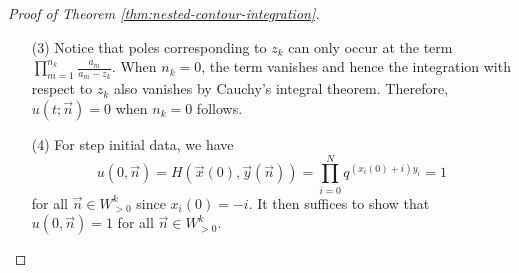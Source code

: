 \begin{proof}[Proof of Theorem \ref{thm:nested-contour-integration}]
\begin{enumerate}
From Equation (\ref{proof-nested-contour}), we have that $\nabla_i u(t;\vec{n}) = - \frac{z_i}{a_{n_i}} u(t;\vec{n})$ and hence 
\begin{align*}
& \quad (\nabla_1 - q \nabla_2) u(t;\vec{n}) \\
&= - \frac{z_1 - qz_2}{a_{n_1}} u(t;\vec{n}) \\
&= \frac{(-1)^k q^{k(k-1)/2}}{(2 \pi i)^k} \times \int \dots \int \left( - \frac{z_1 - qz_2}{a_{n_1}} \right) \prod_{1 \le A < B \le k} \frac{z_A - z_B}{z_A - qz_B} f(t;\vec{n}) \prod_{j=1}^k \frac{dz_j}{z_j} \\
&= \frac{(-1)^k q^{k(k-1)/2}}{(2 \pi i)^k} \times \int \dots \int \left( - \frac{z_1 - z_2}{a_{n_1}} \right) \prod_{A<B, (A,B) \neq (1,2)} \frac{z_A - z_B}{z_A - qz_B} f(t;\vec{n}) \prod_{j=1}^k \frac{dz_j}{z_j} 
\end{align*}
From the last equality, the contours of $z_1$ and $z_2$ can be deformed to be the same without encountering any poles (since the term $z_1 - qz_2$ in the denominator has been canceled). Notice also that in the integrand the terms involving $z_1$ and the terms $z_2$ are separated into identical parts, and hence the integral can be re-written as 
$$(\nabla_1 - q \nabla_2) u(t;\vec{n}) = \int \int (z_1 - z_2) G(z_1) G(z_2) dz_1 dz_2,$$
where $G(z)$ incorporates the integration involving $z_3, z_4, \dots, z_k$. Since the contour of $z_1$ and $z_2$ are the same, we have that 
\begin{align*}
& \quad \int \int (z_1 - z_2) G(z_1) G(z_2) dz_1 dz_2 \\
&= \int z_1 G(z_1) dz_1 \times \int G(z_2) dz_2 - \int z_2 G(z_2) dz_2 \times \int G(z_1) dz_1 \\
&= 0.
\end{align*}
That is, $\nabla_1 u(t;\vec{n}) = q \nabla_2 u(t;\vec{n})$.

\item[(3)] Notice that poles corresponding to $z_k$ can only occur at the term $\prod_{m=1}^{n_k} \frac{a_m}{a_m - z_k}$. When $n_k = 0$, the term vanishes and hence the integration with respect to $z_k$ also vanishes by Cauchy's integral theorem. Therefore, $u(t;\vec{n}) = 0$ when $n_k = 0$ follows. 

\item[(4)] For step initial data, we have $$u(0,\vec{n}) = H(\vec{x}(0),\vec{y}(\vec{n})) = \prod_{i=0}^{N} q^{(x_i(0) + i)y_i} = 1$$ for all $\vec{n} \in W^k_{>0}$ since $x_i(0) = -i$. It then suffices to show that $u(0,\vec{n}) = 1$ for all $\vec{n} \in W^k_{>0}$. 


\end{enumerate}
\end{proof}

